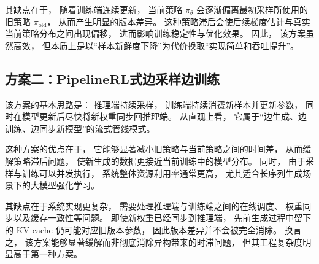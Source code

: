 \documentclass[UTF8]{ctexart}
\begin{document}
其缺点在于，
随着训练端连续更新，
当前策略 $\pi_\theta$ 会逐渐偏离最初采样所使用的旧策略 $\pi_{\mathrm{old}}$，
从而产生明显的版本差异。
这种策略滞后会使后续梯度估计与真实当前策略分布之间出现偏移，
进而影响训练稳定性与优化效果。
因此，
该方案虽然高效，
但本质上是以“样本新鲜度下降”为代价换取“实现简单和吞吐提升”。

\subsection{方案二：PipelineRL式边采样边训练}

该方案的基本思路是：
推理端持续采样，
训练端持续消费新样本并更新参数，
同时在模型更新后尽快将新权重同步回推理端。
从直观上看，
它属于“边生成、边训练、边同步新模型”的流式管线模式。

这种方案的优点在于，
它能够显著减小旧策略与当前策略之间的时间差，
从而缓解策略滞后问题，
使新生成的数据更接近当前训练中的模型分布。
同时，
由于采样与训练可以并发执行，
系统整体资源利用率通常更高，
尤其适合长序列生成场景下的大模型强化学习。

其缺点在于系统实现更复杂，
需要处理推理端与训练端之间的在线调度、
权重同步以及缓存一致性等问题。
即使新权重已经同步到推理端，
先前生成过程中留下的 KV cache 仍可能对应旧版本参数，
因此版本差异并不会被完全消除。
换言之，
该方案能够显著缓解而非彻底消除异构带来的时滞问题，
但其工程复杂度明显高于第一种方案。
\end{document}
